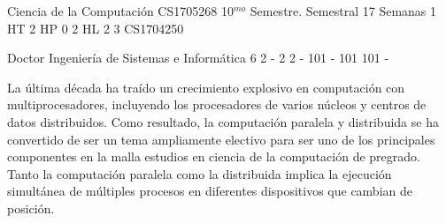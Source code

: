 \documentclass[a4paper,8pt]{article}
\begin{document}
\setNombreProfesor{}
\setGradoProfesorAbreviado{}
\sylabusHeader

\academicaTable
{Ciencia de la Computación} %
{CS1705268} %
{10$^{mo}$ Semestre.} %
{Semestral} %
{17 Semanas} %
{1 HT} %
{2 HP} %
{0} %
{2 HL}  %
{2} %
{3} %
{CS1704250} %

\administrativaTable
{Doctor} %
{Ingeniería de Sistemas e Informática} %
{6} %
{2} %
{-} %
{2} %
{2} %
{-} %
{101} %
{-} %
{101} %
{101} %
{-} %


\begin{fundamentacion}
La última década ha traído un crecimiento explosivo en computación con multiprocesadores, incluyendo 
los procesadores de varios núcleos y centros de datos distribuidos. Como resultado, la computación 
paralela y distribuida se ha convertido de ser un tema ampliamente electivo para ser uno de los principales componentes
en la malla estudios en ciencia de la computación de pregrado. Tanto la computación paralela como la distribuida implica 
la ejecución simultánea de múltiples procesos en diferentes dispositivos que cambian de posición.

\end{fundamentacion}

\begin{sumilla}
\item \PDParallelismFundamentals
\item \PDParallelArchitecture
\item \PDParallelDecomposition
\item \PDCommunicationandCoordination
\item \PDParallelAlgorithmsAnalysisandProgramming
\item \PDParallelPerformance

\end{sumilla}

\begin{competenciasAsignatura}
\item {}
\item {}
\item {}
\item {}
\item {}
\item {}

\end{competenciasAsignatura}
\end{document}
